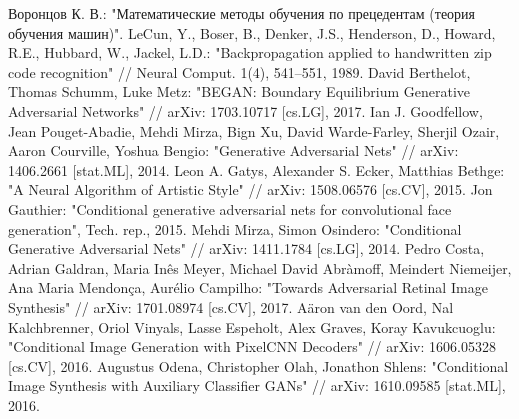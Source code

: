 \documentclass[a4paper]{article}
\begin{document}
	
	\setcounter{page}{2}
	\tableofcontents
	
	
	
	
	
	
	
	
	
	
	
	\begin{thebibliography}{99}
		  Воронцов К. В.: "Математические методы обучения по прецедентам (теория обучения машин)".
		 LeCun, Y., Boser, B., Denker, J.S., Henderson, D., Howard, R.E., Hubbard, W., Jackel, L.D.: "Backpropagation applied to handwritten zip code recognition" // Neural Comput. 1(4), 541–551, 1989.
		 David Berthelot, Thomas Schumm, Luke Metz: "BEGAN: Boundary Equilibrium Generative Adversarial Networks" // arXiv: 1703.10717 [cs.LG], 2017.
		 Ian J. Goodfellow, Jean Pouget-Abadie, Mehdi Mirza, Bign Xu, David Warde-Farley, Sherjil Ozair, Aaron Courville, Yoshua Bengio: "Generative Adversarial Nets" // arXiv: 1406.2661 [stat.ML], 2014.
		 Leon A. Gatys, Alexander S. Ecker, Matthias Bethge: "A Neural Algorithm of Artistic Style" // arXiv: 1508.06576 [cs.CV], 2015.
		 Jon Gauthier: "Conditional generative adversarial nets for convolutional face generation", Tech. rep., 2015.
		 Mehdi Mirza, Simon Osindero: "Conditional Generative Adversarial Nets" // arXiv: 1411.1784 [cs.LG], 2014.
		 Pedro Costa, Adrian Galdran, Maria Inês Meyer, Michael David Abràmoff, Meindert Niemeijer, Ana Maria Mendonça, Aurélio Campilho: "Towards Adversarial Retinal Image Synthesis" // arXiv: 1701.08974 [cs.CV], 2017.
		 A\"aron van den Oord, Nal Kalchbrenner, Oriol Vinyals, Lasse Espeholt, Alex Graves, Koray Kavukcuoglu: "Conditional Image Generation with PixelCNN Decoders" // arXiv: 1606.05328 [cs.CV], 2016.
		 Augustus Odena, Christopher Olah, Jonathon Shlens: "Conditional Image Synthesis with Auxiliary Classifier GANs" // arXiv: 1610.09585 [stat.ML], 2016.

\end{thebibliography}
\end{document}
